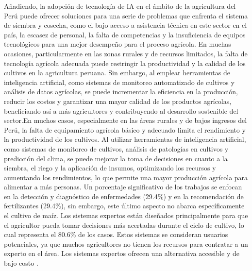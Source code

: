  Añadiendo, la adopción de tecnología de IA en el ámbito de la agricultura del Perú puede ofrecer soluciones para una serie de problemas que enfrenta el sistema de siembra y cosecha, como el bajo acceso a asistencia técnica  en este sector en el país, la escasez de personal, la falta de competencias y la insuficiencia de equipos tecnológicos para una mejor desempeño para el proceso agrícola. En muchas ocasiones, particularmente en las zonas rurales y de recursos limitados, la falta de tecnología agrícola adecuada puede restringir la productividad y la calidad de los cultivos en la agricultura peruana. Sin embargo, al emplear herramientas de inteligencia artificial, como sistemas de monitoreo automatizado de cultivos y análisis de datos agrícolas, se puede incrementar la eficiencia en la producción, reducir los costos y garantizar una mayor calidad de los productos agrícolas, beneficiando así a más agricultores y contribuyendo al desarrollo sostenible del sector.En muchos casos, especialmente en las áreas rurales y de bajos ingresos del Perú, la falta de equipamiento agrícola básico y adecuado limita el rendimiento y la productividad de los cultivos. Al utilizar herramientas de inteligencia artificial, como sistemas de monitoreo de cultivos, análisis de patologías en cultivos y predicción del clima, se puede mejorar la toma de decisiones en cuanto a la siembra, el riego y la aplicación de insumos, optimizando los recursos y aumentando los rendimientos, lo que permite una mayor producción agrícola para alimentar a más personas. Un porcentaje significativo de los trabajos se enfocan en la detección y diagnóstico de enfermedades (29.4\%) y en la recomendación de fertilizantes (29.4\%), sin embargo, este último aspecto no abarca específicamente el cultivo de maíz. Los sistemas expertos están diseñados principalmente para que el agricultor pueda tomar decisiones más acertadas durante el ciclo de cultivo, lo cual representa el 80.6\% de los casos. Estos sistemas se consideran usuarios potenciales, ya que muchos agricultores no tienen los recursos para contratar a un experto en el área. Los sistemas expertos ofrecen una alternativa accesible y de bajo costo \parencite{cr_iaplanta2}. 
 
